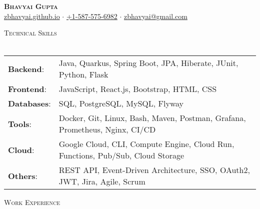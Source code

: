 \documentclass[a4paper]{article}
\newcommand{\lineunder} {
    \vspace*{-8pt} \\
    \hspace*{-18pt} \hrulefill \hspace*{-6pt} \\
}
\newcommand{\header} [1] {
    \vspace*{5pt}
    {\hspace*{-18pt}\vspace*{6pt} \large\textsc{#1}}
    \vspace*{-6pt} \lineunder
}
\begin{document}
\vspace*{-40pt}


\vspace*{-10pt}
\begin{center}
    \textbf{\Huge \scshape {Bhavyai Gupta}}\\
    \href{https://zbhavyai.github.io}{zbhavyai.github.io} $\cdot$ \href{tel:+15875756982}{+1-587-575-6982} $\cdot$ \href{mailto:zbhavyai@gmail.com}{zbhavyai@gmail.com} \\
\end{center}


\header{Technical Skills}

\begin{tabular}{ l l }
    \textbf{Backend}:   & Java, Quarkus, Spring Boot, JPA, Hiberate, JUnit, Python, Flask                   \\
    \textbf{Frontend}:  & JavaScript, React.js, Bootstrap, HTML, CSS                                        \\
    \textbf{Databases}: & SQL, PostgreSQL, MySQL, Flyway                                                    \\
    \textbf{Tools}:     & Docker, Git, Linux, Bash, Maven, Postman, Grafana, Prometheus, Nginx, CI/CD       \\
    \textbf{Cloud}:     & Google Cloud, CLI, Compute Engine, Cloud Run, Functions, Pub/Sub, Cloud Storage   \\
    \textbf{Others}:    & REST API, Event-Driven Architecture, SSO, OAuth2, JWT, Jira, Agile, Scrum         \\
\end{tabular}
\vspace{2mm}


\header{Work Experience}
\end{document}

